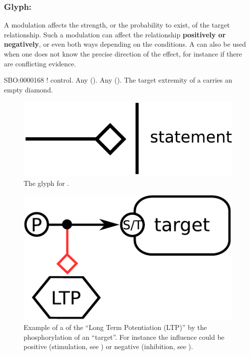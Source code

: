 \color{blue}
\subsubsection{Glyph: }\label{sec:modulation}

A modulation affects the strength, or the probability to exist, of the target relationship. Such a modulation can affect the relationship \textbf{positively or negatively}, or even both ways depending on the conditions. A  can also be used when one does not know the precise direction of the effect, for instance if there are conflicting evidence.

\begin{glyphDescription}
 \glyphSboTerm SBO:0000168 ! control.
 \glyphOrigin Any  ().
 \glyphTarget Any  ().
 \glyphEndPoint The target extremity of a  carries an empty diamond.
 \end{glyphDescription}

\begin{figure}[H]
  \centering
  \includegraphics[scale = 0.3]{images/modulation}
  \caption{The \ER glyph for .}
  \label{fig:modulation}
\end{figure}
 
\begin{figure}[H]
  \centering
  \includegraphics[scale = 0.5]{examples/ex-modulation}
  \caption{Example of a  of the  ``Long Term Potentiation (LTP)'' by the phosphorylation of an  ``target''. For instance the influence could be positive (stimulation, see ) or negative (inhibition, see ).}
  \label{fig:ex-modulation}
\end{figure}

\normalcolor


